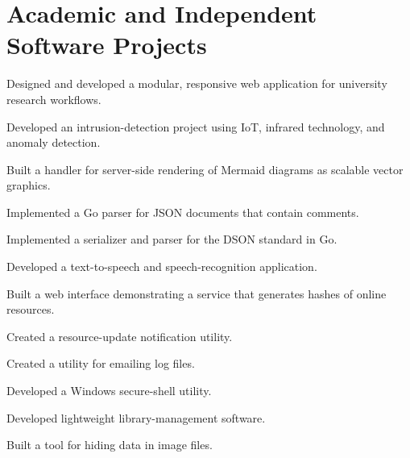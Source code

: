 \section{Academic and Independent Software Projects}
Designed and developed a modular, responsive web application for university
research workflows.

Developed an intrusion-detection project using IoT, infrared technology, and
anomaly detection.

Built a handler for server-side rendering of Mermaid diagrams as scalable
vector graphics.

Implemented a Go parser for JSON documents that contain comments.

Implemented a serializer and parser for the DSON standard in Go.

Developed a text-to-speech and speech-recognition application.

Built a web interface demonstrating a service that generates hashes of online
resources.

Created a resource-update notification utility.

Created a utility for emailing log files.

Developed a Windows secure-shell utility.

Developed lightweight library-management software.

Built a tool for hiding data in image files.
